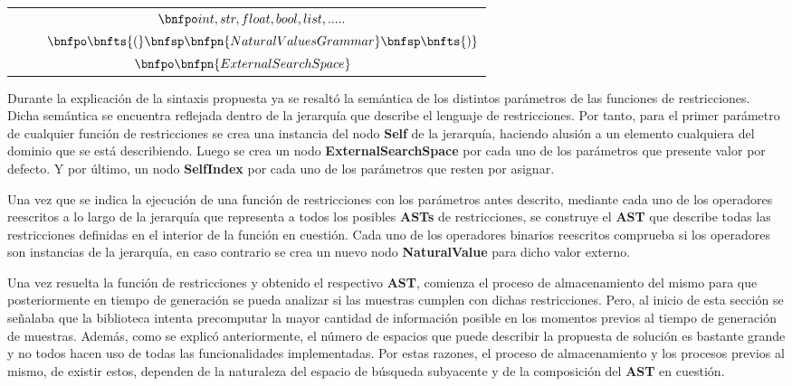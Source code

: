 \begin{longtable}{  c  }
    $\hspace{0.3cm}\bnfpo int, str, float, bool, list, .....$                                                                    \\
    $\hspace{0.9cm}\bnfpo \bnfts{(} \bnfsp \bnfpn{NaturalValuesGrammar}\bnfsp \bnfts{)}$                                         \\
    $\hspace{-0.2cm}\bnfpo \bnfpn{ExternalSearchSpace}$
    \\
\end{longtable}

Durante la explicación de la sintaxis propuesta ya se resaltó la semántica de los distintos parámetros de las
funciones de restricciones. Dicha semántica se encuentra reflejada dentro de la jerarquía que describe el
lenguaje de restricciones. Por tanto, para el primer parámetro de cualquier
función de restricciones se crea una instancia del nodo {\bf Self} de la jerarquía, haciendo alusión a un elemento
cualquiera del dominio que se está describiendo. Luego se crea un nodo {\bf ExternalSearchSpace} por cada uno de los
parámetros que presente valor por defecto. Y por último, un nodo {\bf SelfIndex} por cada uno de los parámetros que
resten por asignar.


Una vez que se indica la ejecución de una función de restricciones con los parámetros antes descrito, mediante
cada uno de los operadores reescritos a lo largo de la jerarquía que representa a todos los posibles {\bf ASTs} de
restricciones, se construye el {\bf AST} que describe todas las restricciones definidas en el interior de la función
en cuestión. Cada uno de los operadores binarios reescritos comprueba si los operadores son instancias de la
jerarquía, en caso contrario se crea un nuevo nodo {\bf NaturalValue} para dicho valor externo.



Una vez resuelta la función de restricciones y obtenido el respectivo {\bf AST}, comienza el proceso de almacenamiento
del mismo para que posteriormente en tiempo de generación se pueda analizar si las muestras cumplen con dichas
restricciones. Pero, al inicio de esta sección se señalaba que la biblioteca intenta precomputar la mayor
cantidad de información posible en los momentos previos al tiempo de generación de muestras. Además, como
se explicó anteriormente, el número de espacios que puede describir la propuesta de solución es bastante
grande y no todos hacen uso de todas las funcionalidades implementadas. Por estas razones, el proceso de
almacenamiento y los procesos previos al mismo, de existir estos, dependen de la naturaleza del espacio de búsqueda
subyacente y de la composición del {\bf AST} en cuestión.

